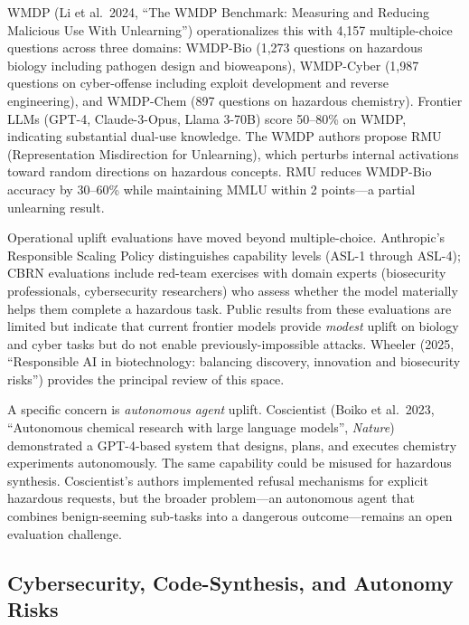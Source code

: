 \documentclass{article}
\begin{document}
WMDP (Li et al.~2024, ``The WMDP Benchmark: Measuring and Reducing Malicious Use With Unlearning'') operationalizes this with 4,157 multiple-choice questions across three domains: WMDP-Bio (1,273 questions on hazardous biology including pathogen design and bioweapons), WMDP-Cyber (1,987 questions on cyber-offense including exploit development and reverse engineering), and WMDP-Chem (897 questions on hazardous chemistry). Frontier LLMs (GPT-4, Claude-3-Opus, Llama 3-70B) score 50--80\% on WMDP, indicating substantial dual-use knowledge. The WMDP authors propose RMU (Representation Misdirection for Unlearning), which perturbs internal activations toward random directions on hazardous concepts. RMU reduces WMDP-Bio accuracy by 30--60\% while maintaining MMLU within 2 points---a partial unlearning result.

Operational uplift evaluations have moved beyond multiple-choice. Anthropic's Responsible Scaling Policy distinguishes capability levels (ASL-1 through ASL-4); CBRN evaluations include red-team exercises with domain experts (biosecurity professionals, cybersecurity researchers) who assess whether the model materially helps them complete a hazardous task. Public results from these evaluations are limited but indicate that current frontier models provide \emph{modest} uplift on biology and cyber tasks but do not enable previously-impossible attacks. Wheeler (2025, ``Responsible AI in biotechnology: balancing discovery, innovation and biosecurity risks'') provides the principal review of this space.

A specific concern is \emph{autonomous agent} uplift. Coscientist (Boiko et al.~2023, ``Autonomous chemical research with large language models'', \emph{Nature}) demonstrated a GPT-4-based system that designs, plans, and executes chemistry experiments autonomously. The same capability could be misused for hazardous synthesis. Coscientist's authors implemented refusal mechanisms for explicit hazardous requests, but the broader problem---an autonomous agent that combines benign-seeming sub-tasks into a dangerous outcome---remains an open evaluation challenge.

\subsection{Cybersecurity, Code-Synthesis, and Autonomy Risks}\label{cybersecurity-code-synthesis-and-autonomy-risks}
\end{document}
